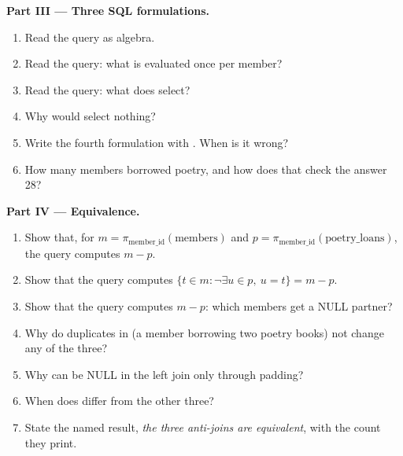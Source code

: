 \begin{problem}
\medskip\noindent\textbf{Part III --- Three SQL formulations.}
\begin{enumerate}[resume]
\item Read the  query as algebra.
\item Read the  query: what is evaluated once per member?
\item Read the  query: what does  select?
\item Why would  select nothing?
\item Write the fourth formulation with . When is it wrong?
\item How many members borrowed poetry, and how does that check the answer 28?
\end{enumerate}

\medskip\noindent\textbf{Part IV --- Equivalence.}
\begin{enumerate}[resume]
\item Show that, for $m = \pi_{\text{member\_id}}(\text{members})$ and $p = \pi_{\text{member\_id}}(\text{poetry\_loans})$,
the  query computes $m - p$.
\item Show that the  query computes $\{t \in m : \neg \exists u \in p,\ u = t\} = m - p$.
\item Show that the  query computes $m - p$: which members get a NULL partner?
\item Why do duplicates in  (a member borrowing two poetry books) not change any of the three?
\item Why can  be NULL in the left join only through padding?
\item When does  differ from the other three?
\item State the named result, \emph{the three anti-joins are equivalent}, with the count they print.
\end{enumerate}
\end{problem}
